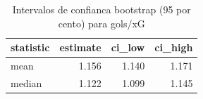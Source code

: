 \begin{table}

\caption{\label{tab:ic_bootstrap_g10}Intervalos de confianca bootstrap (95 por cento) para gols/xG}
\centering
\begin{tabular}[t]{lrrr}
\toprule
statistic & estimate & ci\_low & ci\_high\\
\midrule
mean & 1.156 & 1.140 & 1.171\\
median & 1.122 & 1.099 & 1.145\\
\bottomrule
\end{tabular}
\end{table}
